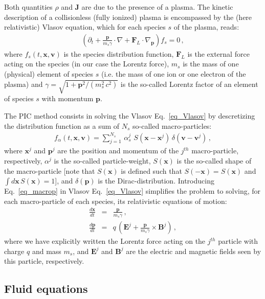 \documentclass[10pt]{article}
\newcommand{\vE}{\mathbf{E}}
\newcommand{\vB}{\mathbf{B}}
\newcommand{\vJ}{\mathbf{J}}
\newcommand{\vx}{\mathbf{x}}
\newcommand{\vp}{\mathbf{p}}
\newcommand{\vv}{\mathbf{v}}
\newcommand{\vF}{\mathbf{F}}
\begin{document}
Both quantities $\rho$ and $\vJ$ are due to the presence of a plasma.
The kinetic description of a collisionless (fully ionized) plasma is encompassed by the (here relativistic) Vlasov equation, which for each species $s$ of the plasma, reads:
\begin{eqnarray}\label{eq_Vlasov}
\left(\partial_t  + \frac{\vp}{m_s \gamma} \cdot \nabla + \vF_L \cdot \nabla_{\vp} \right) f_s = 0\,,
\end{eqnarray}
where $f_s(t,\vx,\vv)$ is the species distribution function, $\vF_L$ is the external force acting on the species (in our case the Lorentz force), $m_s$ is the mass of one (physical) element of species $s$ (i.e. the mass of one ion or one electron of the plasma) and $\gamma = \sqrt{1+\vp^2/(m_s^2\,c^2)}$ is the so-called Lorentz factor of an element of species $s$ with momentum $\vp$.

The PIC method consists in solving the Vlasov Eq.~\eqref{eq_Vlasov} by descretizing the distribution function as a sum of $N_s$ so-called macro-particles:
\begin{eqnarray}\label{eq_macrop}
f_\alpha (t,\vx,\vv) = \sum_{j=1}^{N_s}\,\alpha_s^j\,\,S(\vx-\vx^j)\,\delta(\vv-\vv^j)\,,
\end{eqnarray}
where $\vx^j$ and $\vp^j$ are the position and momentum of the $j^{th}$ macro-particle, respectively, $\alpha^j$ is the so-called particle-weight, $S(\vx)$ is the so-called shape of the macro-particle [note that $S(\vx)$ is defined such that $S(-\vx)=S(\vx)$ and $\int d\vx\,S(\vx)=1$], and $\delta(\vp)$ is the Dirac-distribution. Introducing Eq.~\eqref{eq_macrop} in Vlasov Eq.~\eqref{eq_Vlasov} simplifies the problem to solving, for each macro-particle of each species, its relativistic equations of motion:
\begin{subequations}
\begin{eqnarray}
\frac{d\vx}{dt}  &=& \frac{\vp}{m_s \gamma}\,,\\
\frac{d\vp}{dt}  &=&  q\,\left( \vE^j + \frac{\vp}{m_s \gamma} \times \vB^j \right)\,,
\end{eqnarray}
\end{subequations}
where we have explicitly written the Lorentz force acting on the $j^{th}$ particle with charge $q$ and mass $m_s$, and $\vE^j$ and $\vB^j$ are the electric and magnetic fields seen by this particle, respectively.

\subsection{Fluid equations}
\end{document}
